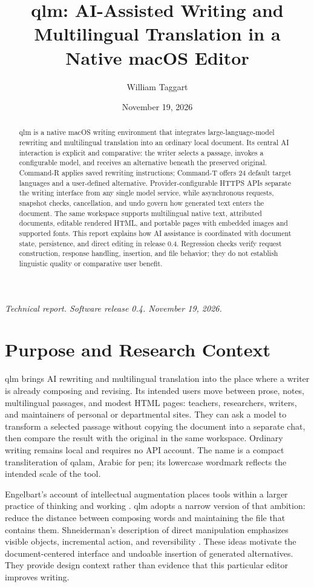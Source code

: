 \documentclass[manuscript,screen,nonacm]{acmart}
\title{qlm: AI-Assisted Writing and Multilingual Translation in a Native macOS Editor}
\author{William Taggart}
\affiliation{\institution{Modern and Classical Languages and Literatures, Virginia Tech}\city{Blacksburg}\state{Virginia}\country{USA}}
\date{November 19, 2026}
\begin{document}
\begin{abstract}

qlm is a native macOS writing environment that integrates large-language-model rewriting and multilingual translation into an ordinary local document. Its central AI interaction is explicit and comparative: the writer selects a passage, invokes a configurable model, and receives an alternative beneath the preserved original. Command-R applies saved rewriting instructions; Command-T offers 24 default target languages and a user-defined alternative. Provider-configurable HTTPS APIs separate the writing interface from any single model service, while asynchronous requests, snapshot checks, cancellation, and undo govern how generated text enters the document. The same workspace supports multilingual native text, attributed documents, editable rendered HTML, and portable pages with embedded images and supported fonts. This report explains how AI assistance is coordinated with document state, persistence, and direct editing in release 0.4. Regression checks verify request construction, response handling, insertion, and file behavior; they do not establish linguistic quality or comparative user benefit.
\end{abstract}
\maketitle
\noindent\textit{Technical report. Software release 0.4. November 19, 2026.}

\section{Purpose and Research Context}

qlm brings AI rewriting and multilingual translation into the place where a writer is already composing and revising. Its intended users move between prose, notes, multilingual passages, and modest HTML pages: teachers, researchers, writers, and maintainers of personal or departmental sites. They can ask a model to transform a selected passage without copying the document into a separate chat, then compare the result with the original in the same workspace. Ordinary writing remains local and requires no API account. The name is a compact transliteration of qalam, Arabic for pen; its lowercase wordmark reflects the intended scale of the tool.

Engelbart's account of intellectual augmentation places tools within a larger practice of thinking and working \cite{engelbart}. qlm adopts a narrow version of that ambition: reduce the distance between composing words and maintaining the file that contains them. Shneiderman's description of direct manipulation emphasizes visible objects, incremental action, and reversibility \cite{shneiderman}. These ideas motivate the document-centered interface and undoable insertion of generated alternatives. They provide design context rather than evidence that this particular editor improves writing.
\end{document}
